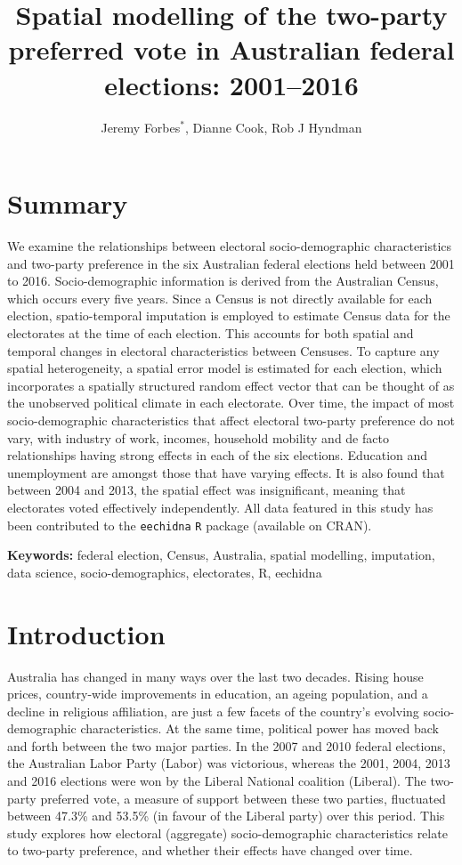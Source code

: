 \documentclass[times, doublespace]{anzsauth}
\title{Spatial modelling of the two-party preferred vote in Australian federal elections: 2001--2016}
\author{Jeremy Forbes\(^*\), Dianne Cook, Rob J Hyndman}
\date{}
\let\oldmaketitle\maketitle
\def\maketitle{\cleanlookdateon\oldmaketitle}
\begin{document}
\maketitle

\hypertarget{summary}{%
\section*{Summary}\label{summary}}

We examine the relationships between electoral socio-demographic characteristics and two-party preference in the six Australian federal elections held between 2001 to 2016. Socio-demographic information is derived from the Australian Census, which occurs every five years. Since a Census is not directly available for each election, spatio-temporal imputation is employed to estimate Census data for the electorates at the time of each election. This accounts for both spatial and temporal changes in electoral characteristics between Censuses. To capture any spatial heterogeneity, a spatial error model is estimated for each election, which incorporates a spatially structured random effect vector that can be thought of as the unobserved political climate in each electorate. Over time, the impact of most socio-demographic characteristics that affect electoral two-party preference do not vary, with industry of work, incomes, household mobility and de facto relationships having strong effects in each of the six elections. Education and unemployment are amongst those that have varying effects. It is also found that between 2004 and 2013, the spatial effect was insignificant, meaning that electorates voted effectively independently. All data featured in this study has been contributed to the \texttt{eechidna} \texttt{R} package (available on CRAN).

\textbf{Keywords:} federal election, Census, Australia, spatial modelling, imputation, data science, socio-demographics, electorates, R, eechidna

\hypertarget{intro}{%
\section{Introduction}\label{intro}}

Australia has changed in many ways over the last two decades. Rising house prices, country-wide improvements in education, an ageing population, and a decline in religious affiliation, are just a few facets of the country's evolving socio-demographic characteristics. At the same time, political power has moved back and forth between the two major parties. In the 2007 and 2010 federal elections, the Australian Labor Party (Labor) was victorious, whereas the 2001, 2004, 2013 and 2016 elections were won by the Liberal National coalition (Liberal). The two-party preferred vote, a measure of support between these two parties, fluctuated between 47.3\% and 53.5\% (in favour of the Liberal party) over this period. This study explores how electoral (aggregate) socio-demographic characteristics relate to two-party preference, and whether their effects have changed over time.
\end{document}
